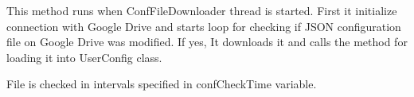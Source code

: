 \documentclass[letterpaper,10pt,english]{sphinxmanual}
\begin{document}
\begin{fulllineitems}

\begin{fulllineitems}
\label{rpicameramon:rpicameramon.filemanipulation.ConfFileDownloader.parse_json}
\end{fulllineitems}


\begin{fulllineitems}
\label{rpicameramon:rpicameramon.filemanipulation.ConfFileDownloader.run}
This method runs when ConfFileDownloader thread is started.
First it initialize connection with Google Drive and starts loop
for checking if JSON configuration file on Google Drive was modified.
If yes, It downloads it and calls the method for loading it into UserConfig class.

File is checked in intervals specified in confCheckTime variable.

\end{fulllineitems}


\end{fulllineitems}

\end{document}
